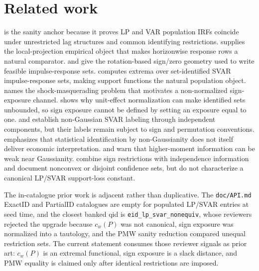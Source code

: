 \documentclass[11pt]{article}
\theoremstyle{definition}
\theoremstyle{plain}
\theoremstyle{remark}
\begin{document}
\section{Related work}
\citet{PlagborgMollerWolf2021} is the sanity anchor because it proves LP and VAR population IRFs coincide under unrestricted lag structures and common identifying restrictions. \citet{Jorda2005} supplies the local-projection empirical object that makes horizonwise response rows a natural comparator. \citet{AriasRubioRamirezWaggoner2018} and \citet{Read2022SignZero} give the rotation-based sign/zero geometry used to write feasible impulse-response sets. \citet{GafarovMeierMontielOlea2018} computes extrema over set-identified SVAR impulse-response sets, making support functions the natural population object. \citet{Wolf2022} names the shock-masquerading problem that motivates a non-normalized sign-exposure channel. \citet{Read2022UnitEffect} shows why unit-effect normalization can make identified sets unbounded, so sign exposure cannot be defined by setting an exposure equal to one. \citet{GourierouxMonfortRenne2017} and \citet{LanneMeitzSaikkonen2017} establish non-Gaussian SVAR labeling through independent components, but their labels remain subject to sign and permutation conventions. \citet{LanneLuoto2021} emphasizes that statistical identification by non-Gaussianity does not itself deliver economic interpretation. \citet{MontielOleaPlagborgMollerQian2022} and \citet{HoeschLeeMesters2024} warn that higher-moment information can be weak near Gaussianity. \citet{DrautzburgWright2023} combine sign restrictions with independence information and document nonconvex or disjoint confidence sets, but do not characterize a canonical LP/SVAR support-loss constant.

The in-catalogue prior work is adjacent rather than duplicative. The \texttt{doc/API.md} ExactID and PartialID catalogues are empty for populated LP/SVAR entries at seed time, and the closest banked qid is \texttt{eid\_lp\_svar\_nonequiv}, whose reviewers rejected the upgrade because \(c_w(P)\) was not canonical, sign exposure was normalized into a tautology, and the PMW sanity reduction compared unequal restriction sets. The current statement consumes those reviewer signals as prior art: \(c_w(P)\) is an extremal functional, sign exposure is a slack distance, and PMW equality is claimed only after identical restrictions are imposed.
\end{document}
